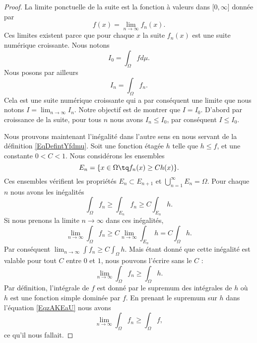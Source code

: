 \begin{proof}
	La limite ponctuelle de la suite est la fonction à valeurs dans \( \mathopen[ 0 , \infty \mathclose]\) donnée par
	\begin{equation}
		f(x)=\lim_{n\to \infty} f_n(x).
	\end{equation}
	Ces limites existent parce que pour chaque \( x\) la suite \( f_n(x)\) est une suite numérique croissante. Nous notons
	\begin{equation}
		I_0=\int_{\Omega}fd\mu.
	\end{equation}
	Nous posons par ailleurs
	\begin{equation}
		I_n=\int_{\Omega}f_n.
	\end{equation}
	Cela est une suite numérique croissante qui a par conséquent une limite que nous notons \( I=\lim_{n\to \infty} I_n\). Notre objectif est de montrer que \( I=I_0\). D'abord par croissance de la suite, pour tous \( n\) nous avons \( I_n\leq I_0\), par conséquent \( I\leq I_0\).

	Nous prouvons maintenant l'inégalité dans l'autre sens en nous servant de la définition \eqref{EqDefintYfdmu}. Soit une fonction étagée \( h\) telle que \( h\leq f\), et une constante \( 0<C<1\). Nous considérons les ensembles
	\begin{equation}
		E_n=\{ x\in\Omega\tq f_n(x)\geq Ch(x) \}.
	\end{equation}
	Ces ensembles vérifient les propriétés \( E_n\subset E_{n+1}\) et \( \bigcup_{n=1}^{\infty}E_n=\Omega\). Pour chaque \( n\) nous avons les inégalités
	\begin{equation}
		\int_{\Omega}f_n\geq\int_{E_n}f_n\geq C\int_{E_n}h.
	\end{equation}
	Si nous prenons la limite \( n\to\infty\) dans ces inégalités,
	\begin{equation}
		\lim_{n\to \infty} \int_{\Omega}f_n\geq C\lim_{n\to \infty} \int_{E_n}h=C\int_{\Omega}h.
	\end{equation}
	Par conséquent \( \lim_{n\to \infty} \int f_n\geq C\int_{\Omega}h\). Mais étant donné que cette inégalité est valable pour tout \( C\) entre \( 0\) et \( 1\), nous pouvons l'écrire sans le \( C\) :
	\begin{equation}        \label{EqzAKEaU}
		\lim_{n\to \infty} \int_{\Omega}f_n\geq \int_{\Omega}h.
	\end{equation}
	Par définition, l'intégrale de \( f\) est donné par le supremum des intégrales de \( h\) où \( h\) est une fonction simple dominée par \( f\). En prenant le supremum sur \( h\) dans l'équation \eqref{EqzAKEaU} nous avons
	\begin{equation}
		\lim_{n\to \infty} \int_{\Omega}f_n\geq\int_{\Omega}f,
	\end{equation}
	ce qu'il nous fallait.
\end{proof}

